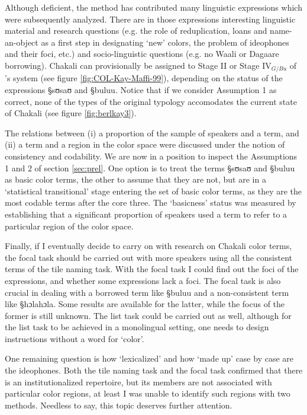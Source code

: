 Although deficient, the method has contributed many  linguistic
expressions  which were subsequently analyzed.  There are in those expressions
interesting linguistic material and research questions (e.g. the role of
reduplication, loans and name-an-object as a first step in designating  `new'
colors, the
problem of ideophones and their foci,  etc.) and socio-linguistic questions
(e.g.  no Waali or Dagaare borrowing). 
Chakali can provisionally be assigned to Stage II  or Stage IV$_{G/Bu}$ of 
\citeauthor{Kay99}'s
system  (see figure \ref{fig:COL-Kay-Maffi-99}),
depending on
the status of the expressions {\S sʊsaʊ} and {\S buluu}. Notice that if we
consider Assumption 1 as correct,  none of the types of the original
typology accomodates the current state of Chakali (see figure
\ref{fig:berlkay3}). 


The relations between (i) a  proportion of the  sample of speakers and a term,
and (ii) a term and a region in the color space were discussed
under the notion of consistency and codability.  We are now in a position to
inspect the Assumptions 1 and 2 of section \ref{sec:prel}. One option is to
treat the terms  {\S sʊsaʊ} and {\S buluu} as basic color terms, the other to
assume  that they are not, but are in a `statistical
transitional'
stage
entering the set of basic color terms, as they are the most codable terms
after the core three. The `basicness' status was measured by establishing that 
a significant proportion of speakers  used a  term to refer to a particular
region of
the color space.

Finally,  if  I eventually decide to carry on with research on Chakali
color terms, the focal task should be carried out with more speakers using all
the consistent terms of the tile naming task. With the focal task
I could find out  the foci of the expressions, and whether some expressions 
lack a foci. The focal task is also crucial in dealing with a
borrowed term like {\S buluu} and a non-consistent term like {\S hɔlahɔla}. Some
results are available for the latter, while the focus of the former is still
unknown. The list task could be carried out as well, although for the
list task to be achieved in a monolingual setting, one needs to design
instructions without a word for `color'.

One remaining question is how `lexicalized' and how `made up' case by case are
the ideophones. Both the tile naming task and the focal task confirmed that
there is an institutionalized repertoire, but  its members are not
associated with  particular color regions, at least I was unable to identify
such   regions with two  methods. Needless to say, this topic deserves further
attention.
